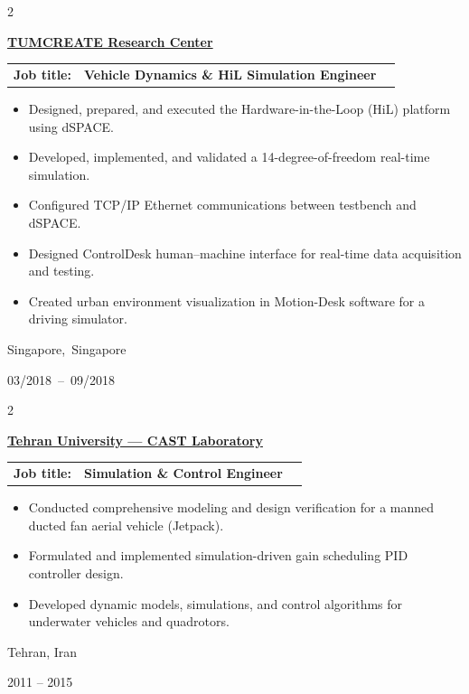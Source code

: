 \documentclass[10pt, letterpaper]{article}
\newenvironment{highlights}{
    \begin{itemize}[
        topsep=0.10 cm,
        parsep=0.10 cm,
        partopsep=0pt,
        itemsep=0pt,
        leftmargin=0.2 cm + 10pt
    ]
}{
    \end{itemize}
} %
\newenvironment{twocolentry}[2][]{
    \onecolentry
    \def\secondColumn{#2}
    \setcolumnwidth{\fill, 2.8 cm}
    \begin{paracol}{2}
}{
    \switchcolumn \raggedleft \secondColumn
    \end{paracol}
    \endonecolentry
} %
\let\hrefWithoutArrow\href
\renewcommand{\href}[2]{\hrefWithoutArrow{#1}{#2}}
\begin{document}
        \begin{twocolentry}{
        {\hspace{-3em}\mbox{Singapore,~Singapore}}

        03/2018~–~09/2018
        }
            \textbf{{\href{https://www.tum-create.edu.sg/research/individual-mobility-vehicles-services}{\color{black}\Large{TUMCREATE Research Center}}}} \\
\vspace{-.6em}

            \begin{tabular}{ l l l }
            \textbf{Job title:} & \textbf{Vehicle Dynamics \& HiL Simulation Engineer}  
            \end{tabular}
    
            \begin{highlights}
                \item Designed, prepared, and executed the Hardware-in-the-Loop (HiL) platform using dSPACE.
                \item Developed, implemented, and validated a 14-degree-of-freedom real-time simulation.
                \item Configured TCP/IP Ethernet communications between testbench and dSPACE.
                \item Designed ControlDesk human--machine interface for real-time data acquisition and testing.
                \item Created urban environment visualization in Motion-Desk software for a driving simulator.
            \end{highlights}
        \end{twocolentry}
        \begin{twocolentry}{
            Tehran, Iran

        2011 – 2015
        }
            \textbf{{\href{https://cast-tech.ir/}{\color{black}\Large{Tehran University --- CAST Laboratory}}}} \\
\vspace{-.6em}

            \begin{tabular}{ l l l }
            \textbf{Job title:} &  \textbf{Simulation \& Control Engineer} \\  
            \end{tabular}
    
            \begin{highlights}
                \item Conducted comprehensive modeling and design verification for a manned ducted fan aerial vehicle (Jetpack).
                \item Formulated and implemented simulation-driven gain scheduling PID controller design.
                \item Developed dynamic models, simulations, and control algorithms for underwater vehicles and quadrotors.
            \end{highlights}
        \end{twocolentry}
\end{document}
